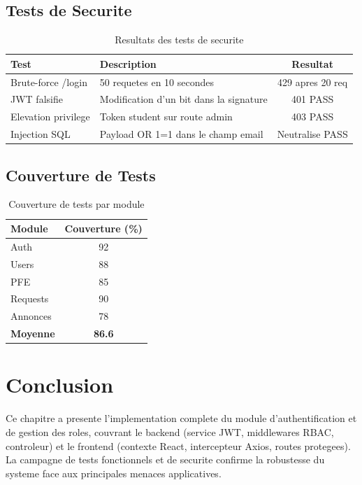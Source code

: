 \documentclass[12pt,a4paper]{report}
\begin{document}
\subsection{Tests de Securite}

\begin{table}[H]
\centering
\caption{Resultats des tests de securite}
\begin{tabular}{lp{6cm}c}
\toprule
\textbf{Test} & \textbf{Description} & \textbf{Resultat} \\
\midrule
Brute-force /login &
  50 requetes en 10 secondes &
  429 apres 20 req \\
JWT falsifie &
  Modification d'un bit dans la signature &
  401 PASS \\
Elevation privilege &
  Token student sur route admin &
  403 PASS \\
Injection SQL &
  Payload OR 1=1 dans le champ email &
  Neutralise PASS \\
\bottomrule
\end{tabular}
\end{table}

\subsection{Couverture de Tests}

\begin{table}[H]
\centering
\caption{Couverture de tests par module}
\begin{tabular}{lc}
\toprule
\textbf{Module} & \textbf{Couverture (\%)} \\
\midrule
Auth         & 92 \\
Users        & 88 \\
PFE          & 85 \\
Requests     & 90 \\
Annonces     & 78 \\
\midrule
\textbf{Moyenne} & \textbf{86.6} \\
\bottomrule
\end{tabular}
\end{table}

\section{Conclusion}

Ce chapitre a presente l'implementation complete du module
d'authentification et de gestion des roles, couvrant le backend
(service JWT, middlewares RBAC, controleur) et le frontend (contexte
React, intercepteur Axios, routes protegees). La campagne de tests
fonctionnels et de securite confirme la robustesse du systeme face aux
principales menaces applicatives.
\end{document}
